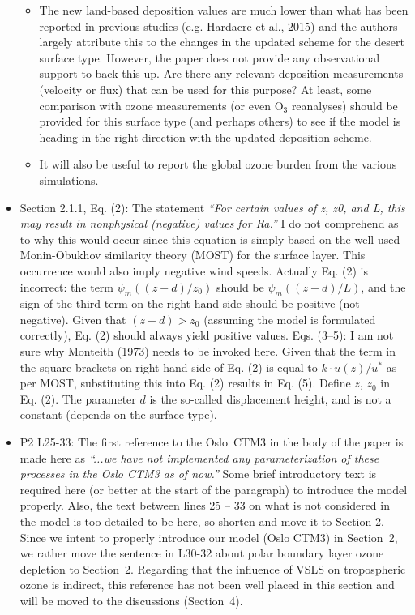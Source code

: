 \documentclass{scrartcl}
\begin{document}
\begin{itemize}
\begin{itemize}
  \item {\color{blue}  The new land-based deposition values are much lower than what has
    been reported in previous studies (e.g. Hardacre et al., 2015) and the authors largely
    attribute this to the changes in the updated scheme for the desert surface type. However,
    the paper does not provide any observational support to back this up. Are there
    any relevant deposition measurements (velocity or flux) that can be used for this purpose?
    At least, some comparison with ozone measurements (or even $\mathrm{O_3}$ reanalyses)
    should be provided for this surface type (and perhaps others) to see if the model is
    heading in the right direction with the updated deposition scheme.} \emph{}
  \item {\color{blue}  It will also be useful to report the global ozone burden from the various
    simulations.}
    \emph{}
  \end{itemize}
  
\item {\color{blue}  Section 2.1.1, Eq. (2): The statement \emph{“For certain values of z, z0, and L, this
    may result in nonphysical (negative) values for Ra.”} I do not comprehend as to why
  this would occur since this equation is simply based on the well-used Monin-Obukhov
  similarity theory (MOST) for the surface layer. This occurrence would also imply negative wind speeds.
  Actually Eq. (2) is incorrect: the term $\psi_m((z-d)/z_0)$ should be
  $\psi_m((z-d)/L)$, and the sign of the third term on the right-hand side should be positive
  (not negative). Given that $(z-d) > z_0$ (assuming the model is formulated correctly), Eq. (2) should always yield positive values.
  Eqs. (3--5): I am not sure why Monteith (1973) needs to be invoked here. Given that
  the term in the square brackets on right hand side of Eq. (2) is equal to $k\cdot u(z)/u^{*}$ as per
  MOST, substituting this into Eq. (2) results in Eq. (5).
  Define $z$, $z_0$ in Eq. (2). The parameter $d$ is the so-called displacement height, and is
  not a constant (depends on the surface type).}
  \emph{}

\item {\color{blue}  P2 L25-33: The first reference to the Oslo~CTM3 in the body of the paper is
  made here as \emph{“...we have not implemented any parameterization of these processes
    in the Oslo CTM3 as of now.”} Some brief introductory text is required here (or better at
  the start of the paragraph) to introduce the model properly. Also, the text between lines
  25 -- 33 on what is not considered in the model is too detailed to be here, so shorten
  and move it to Section 2.}
  Since we intent to properly introduce our model (Oslo CTM3) in Section~2, we rather
  move the sentence in L30-32 about polar boundary layer ozone depletion to Section~2.
  Regarding that the influence of VSLS on tropospheric ozone is indirect, this reference has not been
  well placed in this section and will be moved to the discussions (Section~4).


\end{itemize}
\end{document}
